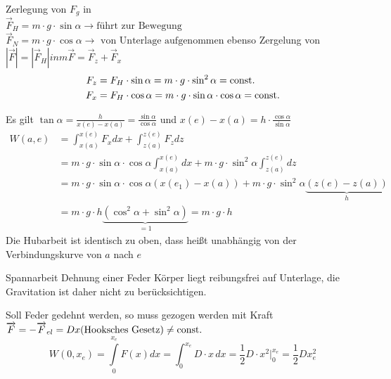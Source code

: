 \documentclass[a4paper,10pt]{scrartcl}
\begin{document}

Zerlegung von $F_g$ in\\
$\vec F_H=m\cdot g\cdot \sin \alpha \to \text{führt zur Bewegung}$
$\vec F_N=m\cdot g\cdot \cos \alpha \to \text{ von Unterlage aufgenommen}$
ebenso Zergelung von $|\vec F|=|\vec F_H| in m\vec F=\vec F_z+\vec F_x$
\begin{align*}
 F_z&=F_H\cdot \sin \alpha =m\cdot g \cdot \sin^2 \alpha=\text{const}.\\
 F_x&= F_H\cdot \cos \alpha =m\cdot g\cdot \sin \alpha \cdot \cos \alpha=\text{const}.
\end{align*}

Es gilt $\tan\alpha=\frac{h}{x(e)-x(a)}=\frac{\sin\alpha}{\cos\alpha}$ und $x(e)-x(a)=h\cdot \frac{\cos\alpha}{\sin\alpha}$
\begin{align*}
 W(a,e)&=\int_{x(a)}^{x(e)} F_x dx+\int_{z(a)}^{z(e)} F_z dz\\
 &= m \cdot g \cdot \sin \alpha \cdot \cos \alpha \int_{x(a)}^{x(e)} dx+ m\cdot g\cdot \sin^2 \alpha \int_{z(a)}^{z(e)} dz\\
 &= m\cdot g\cdot \sin \alpha\cdot \cos\alpha (x(e_1)-x(a))+m\cdot g \cdot \sin^2{\alpha} \underbrace{(z(e)-z(a))}_h\\
 &=m\cdot g\cdot h\underbrace{(\cos^2\alpha +\sin^2\alpha)}_{=1}=m\cdot g\cdot h 
\end{align*}
Die Hubarbeit ist identisch zu oben, dass heißt unabhängig von der Verbindungskurve von $a$ nach $e$
\begin{seg}{Spannarbeit}
Dehnung einer Feder Körper liegt reibungsfrei auf Unterlage, die Gravitation ist daher nicht zu berücksichtigen.
 
Soll Feder gedehnt werden, so muss gezogen werden mit Kraft $\overrightarrow{F}=-\overrightarrow{F}_{el}=Dx (\text{Hooksches Gesetz})\neq \text{const}.$
\[
 W(0,x_e)=\int\limits_0^{x_e} F(x) dx=\int_0^{x_e} D\cdot x\,dx=\frac{1}{2} D \cdot x^2 |_0^{x_e}= \frac 1 2 D x_e^2
\]
\end{seg}
% 
\end{document}

